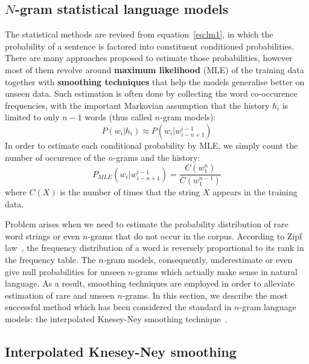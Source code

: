 \subsection{$N$-gram statistical language models}
The statistical methods are revised from equation~\ref{eq:lm1}, in which the probability of a sentence is factored into constituent conditioned probabilities. There are many approaches proposed to estimate those probabilities, however most of them revolve around \textbf{maximum likelihood} (MLE) of the training data together with \textbf{smoothing techniques} that help the models generalise better on unseen data. Such estimation is often done by collecting the word co-occurence frequencies, with the important Markovian assumption that the history $h_i$ is limited to only $n - 1$ words (thus called $n$-gram models):
\begin{equation}
\label{eq:markov}
P(w_i|h_i) \approx P(w_i|w_{i-n+1}^{i-1})
\end{equation}
In order to estimate each conditional probability by MLE, we simply count the number of occurence of the $n$-grams and the history:
\begin{equation}
\label{eq:ngramMLE}
 P_{MLE}(w_i|w_{i-n+1}^{i-1}) = \frac {C(w_1^n)} {C(w_1^{n-1})}
\end{equation}
where $C(X)$ is the number of times that the string $X$ appears in the training data.

Problem arises when we need to estimate the probability distribution of rare word strings or even $n$-grams that do not occur in the corpus. According to Zipf law~\cite{kingsley1932selective}, the frequency distribution of a word is reversely proportional to its rank in the frequency table. The $n$-gram models, consequently, underestimate or even give
null probabilities for unseen $n$-grams which actually make sense in natural language. As a result, smoothing techniques are employed in order to alleviate estimation of rare and unseen $n$-grams. In this section, we describe the most successful method which has been considered the standard in $n$-gram language models: the interpolated Knesey-Ney smoothing technique~\cite{kneser1995improved}. 


\subsection{Interpolated Knesey-Ney smoothing}


